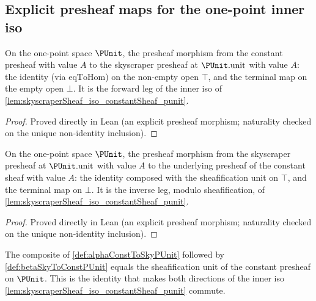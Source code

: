 \subsection{Explicit presheaf maps for the one-point inner iso}

\begin{definition}
  \label{def:alphaConstToSkyPUnit}
  On the one-point space \(\PUnit\), the presheaf morphism from the
  constant presheaf with value \(A\) to the skyscraper presheaf at
  \(\PUnit.\mathrm{unit}\) with value \(A\): the identity (via
  \(\mathrm{eqToHom}\)) on the non-empty open \(\top\), and the terminal
  map on the empty open \(\bot\). It is the forward leg of the inner iso
  of \cref{lem:skyscraperSheaf_iso_constantSheaf_punit}.
\end{definition}

\begin{proof}\leanok
 Proved directly in Lean (an explicit presheaf morphism;
  naturality checked on the unique non-identity inclusion).
\end{proof}

\begin{definition}
  \label{def:betaSkyToConstPUnit}
  On the one-point space \(\PUnit\), the presheaf morphism from the
  skyscraper presheaf at \(\PUnit.\mathrm{unit}\) with value \(A\) to the
  underlying presheaf of the constant sheaf with value \(A\): the
  identity composed with the sheafification unit on \(\top\), and the
  terminal map on \(\bot\). It is the inverse leg, modulo
  sheafification, of \cref{lem:skyscraperSheaf_iso_constantSheaf_punit}.
\end{definition}

\begin{proof}\leanok
 Proved directly in Lean (an explicit presheaf morphism;
  naturality checked on the unique non-identity inclusion).
\end{proof}

\begin{lemma}
  \label{lem:alpha_beta_eq_toSheafify}
  The composite of \cref{def:alphaConstToSkyPUnit} followed by
  \cref{def:betaSkyToConstPUnit} equals the sheafification unit of the
  constant presheaf on \(\PUnit\). This is the identity that makes both
  directions of the inner iso
  \cref{lem:skyscraperSheaf_iso_constantSheaf_punit} commute.
\end{lemma}

